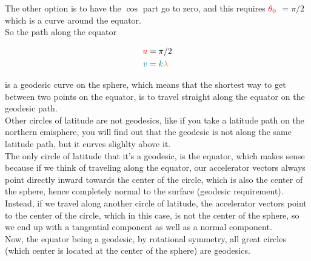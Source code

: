 The other option is to have the $\cos$ part go to zero, and this requires $\color{red}\theta_0$ $=\pi/2$ which is a curve around the equator.\\

So the path along the equator

\begin{align*}
    \begingroup\color{red}u\endgroup &= \pi/2\\
    \begingroup\color{teal}v\endgroup &= \begingroup\color{teal}k\endgroup \begingroup\color{brown}\lambda\endgroup
\end{align*}

is a geodesic curve on the sphere, which means that the shortest way to get between two points on the equator, is to travel straight along the equator
on the geodesic path.\\
Other circles of latitude are not geodesics, like if you take a latitude path on the northern emisphere, you will find out that the geodesic is not along
the same latitude path, but it curves slighlty above it.\\
The only circle of latitude that it's a geodesic, is the equator, which makes sense because if we think of traveling along the equator, our
accelerator vectors always point directly inward towards the center of the circle, which is also the center of the sphere, hence completely normal to the surface (geodesic requirement).
Instead, if we travel along another circle of latitude, the accelerator vectors point to the center of the circle, which in this case, is not the center of the sphere, so we end up with a tangential 
component as well as a normal component.\\
Now, the equator being a geodesic, by rotational symmetry, all great circles (which center is located at the center of the sphere) are geodesics.
